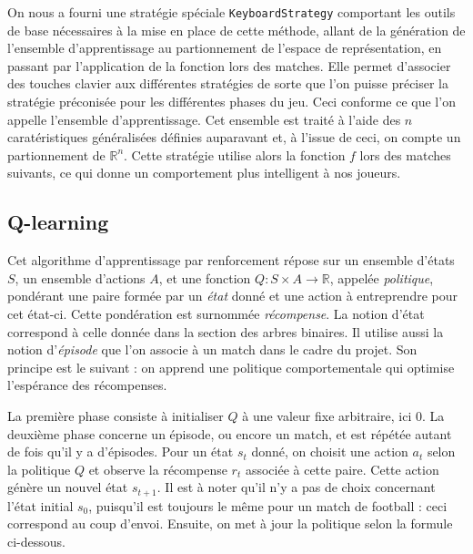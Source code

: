 \documentclass[12pt,a4paper]{article}
\begin{document}
On nous a fourni une strat\'egie sp\'eciale \texttt{KeyboardStrategy} 
comportant les outils de base n\'ecessaires \`a la mise en place de cette 
m\'ethode, allant de la g\'en\'eration de l'ensemble d'apprentissage au 
partionnement de l'espace de repr\'esentation, en passant par l'application de 
la fonction lors des matches. 
Elle permet d'associer des touches clavier aux diff\'erentes strat\'egies de 
sorte que l'on puisse pr\'eciser la strat\'egie pr\'econis\'ee pour les 
diff\'erentes phases du jeu. Ceci conforme ce que l'on appelle l'ensemble 
d'apprentissage. Cet ensemble est trait\'e \`a l'aide des $n$ carat\'eristiques 
g\'en\'eralis\'ees d\'efinies auparavant et, \`a l'issue de ceci, on compte 
un partionnement de $\mathbb{R}^n$. Cette strat\'egie utilise alors la fonction 
$f$ lors des matches suivants, ce qui donne un comportement plus intelligent 
\`a nos joueurs.


\subsection*{Q-learning}
Cet algorithme d'apprentissage par renforcement r\'epose sur un ensemble 
d'\'etats $S$, un ensemble d'actions $A$, et une fonction $Q: S \times A \to 
\mathbb{R}$, appel\'ee {\itshape politique}, pond\'erant une paire form\'ee 
par un {\itshape \'etat} donn\'e et une action \`a entreprendre pour cet 
\'etat-ci. Cette pond\'eration est surnomm\'ee {\itshape r\'ecompense}. La 
notion d'\'etat correspond \`a celle donn\'ee dans la section des arbres 
binaires. Il utilise aussi la notion d'{\itshape \'episode} que l'on associe 
\`a un match dans le cadre du projet. Son principe est le suivant : on apprend 
une politique comportementale qui optimise l'esp\'erance des r\'ecompenses.

La premi\`ere phase consiste \`a initialiser $Q$ \`a une valeur fixe 
arbitraire, ici 0. La deuxi\`eme phase concerne un \'episode, ou encore un 
match, et est r\'ep\'et\'ee autant de fois qu'il y a d'\'episodes. Pour un 
\'etat $s_t$ donn\'e, on choisit une action $a_t$ selon la politique $Q$ et 
observe la r\'ecompense $r_t$ associ\'ee \`a cette paire. Cette action 
g\'en\`ere un nouvel \'etat $s_{t+1}$. Il est \`a noter qu'il n'y a pas de 
choix concernant l'\'etat initial $s_0$, puisqu'il est toujours le m\^eme pour 
un match de football : ceci correspond au coup d'envoi. Ensuite, on met \`a 
jour la politique selon la formule ci-dessous.
\end{document}
